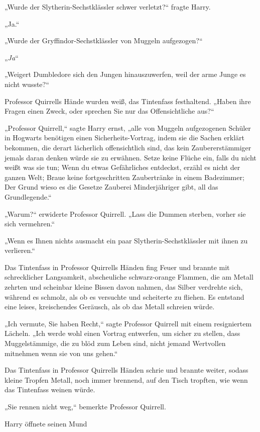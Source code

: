 {„Wurde der Slytherin-Sechstklässler schwer verletzt?“ fragte Harry.

„Ja.“

„Wurde der Gryffindor-Sechstklässler von Muggeln aufgezogen?“

„\emph{Ja}“

„Weigert Dumbledore sich den Jungen hinauszuwerfen, weil der arme Junge es nicht wusste?“

Professor Quirrells Hände wurden weiß, das Tintenfass festhaltend. „Haben ihre Fragen einen Zweck, oder sprechen Sie nur das Offensichtliche aus?“

„Professor Quirrell,“ sagte Harry ernst, „alle von Muggeln aufgezogenen Schüler in Hogwarts benötigen einen Sicherheits-Vortrag, indem sie die Sachen erklärt bekommen, die derart lächerlich offensichtlich sind, das kein Zaubererstämmiger jemals daran denken würde sie zu erwähnen. Setze keine Flüche ein, falls du nicht weißt was sie tun; Wenn du etwas Gefährliches entdeckst, erzähl es nicht der ganzen Welt; Braue keine fortgeschritten Zaubertränke in einem Badezimmer; Der Grund wieso es die Gesetze Zauberei Minderjähriger gibt, all das Grundlegende.“

„Warum?“ erwiderte Professor Quirrell. „Lass die Dummen sterben, vorher sie sich vermehren.“

„Wenn es Ihnen nichts ausmacht ein paar Slytherin-Sechstklässler mit ihnen zu verlieren.“

Das Tintenfass in Professor Quirrells Händen fing Feuer und brannte mit schrecklicher Langsamkeit, abscheuliche schwarz-orange Flammen, die am Metall zehrten und scheinbar kleine Bissen davon nahmen, das Silber verdrehte sich, während es schmolz, als ob es versuchte und scheiterte zu fliehen. Es entstand eine leises, kreischendes Geräusch, als ob das Metall schreien würde.

„Ich vermute, Sie haben Recht,“ sagte Professor Quirrell mit einem resigniertem Lächeln. „Ich werde wohl einen Vortrag entwerfen, um sicher zu stellen, dass Muggelstämmige, die zu blöd zum Leben sind, nicht jemand Wertvollen mitnehmen wenn sie von uns gehen.“

Das Tintenfass in Professor Quirrells Händen schrie und brannte weiter, sodass kleine Tropfen Metall, noch immer brennend, auf den Tisch tropften, wie wenn das Tintenfass weinen würde.

„Sie rennen nicht weg,“ bemerkte Professor Quirrell.

Harry öffnete seinen Mund \later

}
